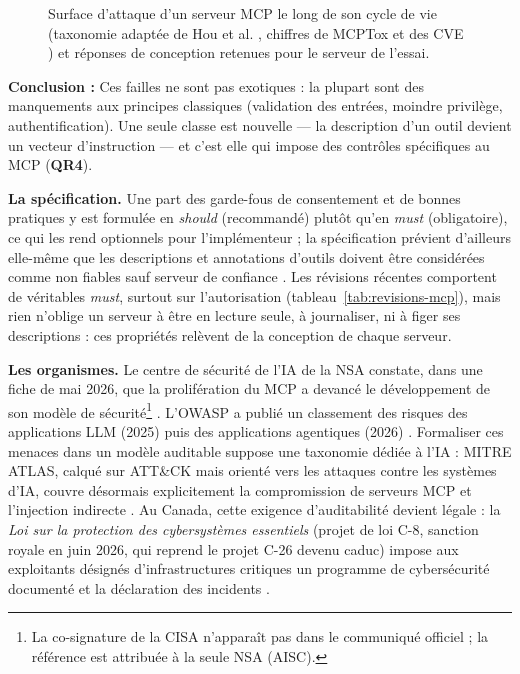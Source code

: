 \begin{figure}[htbp]
\centering
{}
\caption{Surface d'attaque d'un serveur MCP le long de son cycle de vie (taxonomie adaptée de Hou et al. \cite{hou}, chiffres de MCPTox \cite{mcptox} et des CVE \cite{cve6514,cve49596}) et réponses de conception retenues pour le serveur de l'essai.}\label{fig:surface-attaque}
\end{figure}
\begin{encadre}
\textbf{Conclusion :} Ces failles ne sont pas exotiques : la plupart sont des manquements aux principes classiques (validation des entrées, moindre privilège, authentification). Une seule classe est nouvelle --- la description d'un outil devient un vecteur d'instruction --- et c'est elle qui impose des contrôles spécifiques au MCP (\textbf{QR4}).
\end{encadre}


\textbf{La spécification.} Une part des garde-fous de consentement et de bonnes pratiques y est formulée en \emph{should} (recommandé) plutôt qu'en \emph{must} (obligatoire), ce qui les rend optionnels pour l'implémenteur ; la spécification prévient d'ailleurs elle-même que les descriptions et annotations d'outils doivent être considérées comme non fiables sauf serveur de confiance \cite{mcpspec2025}. Les révisions récentes comportent de véritables \emph{must}, surtout sur l'autorisation (tableau~\ref{tab:revisions-mcp}), mais rien n'oblige un serveur à être en lecture seule, à journaliser, ni à figer ses descriptions : ces propriétés relèvent de la conception de chaque serveur.

\textbf{Les organismes.} Le centre de sécurité de l'IA de la NSA constate, dans une fiche de mai 2026, que la prolifération du MCP a devancé le développement de son modèle de sécurité\footnote{La co-signature de la CISA n'apparaît pas dans le communiqué officiel ; la référence est attribuée à la seule NSA (AISC).} \cite{nsa}. L'OWASP a publié un classement des risques des applications LLM (2025) puis des applications agentiques (2026) \cite{owasp}. Formaliser ces menaces dans un modèle auditable suppose une taxonomie dédiée à l'IA : MITRE ATLAS, calqué sur ATT\&CK mais orienté vers les attaques contre les systèmes d'IA, couvre désormais explicitement la compromission de serveurs MCP et l'injection indirecte \cite{atlas}. Au Canada, cette exigence d'auditabilité devient légale : la \emph{Loi sur la protection des cybersystèmes essentiels} (projet de loi C-8, sanction royale en juin 2026, qui reprend le projet C-26 devenu caduc) impose aux exploitants désignés d'infrastructures critiques un programme de cybersécurité documenté et la déclaration des incidents \cite{lpce}.

